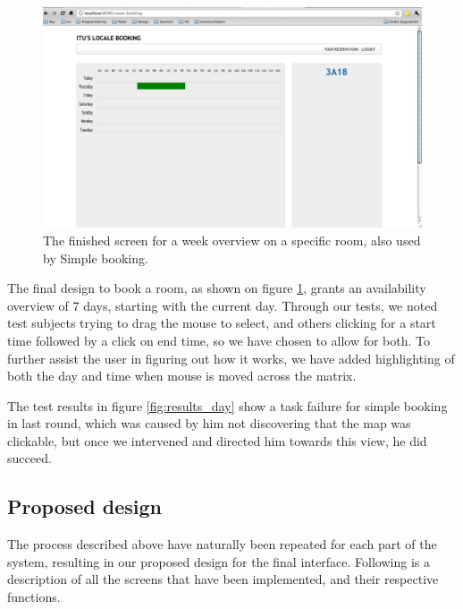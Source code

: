 \pagebreak
\begin{figure}[htb]
\begin{center}
\leavevmode
\includegraphics[width=1\textwidth]{images/weekFinal}
\end{center}
\caption{The finished screen for a week overview on a specific room, also used by Simple booking.}
\label{fig:week_final}
\end{figure}

The final design to book a room, as shown on figure \ref{fig:week_final}, grants an availability overview of 7 days, starting with the current day. Through our tests, we noted test subjects trying to drag the mouse to select, and others clicking for a start time followed by a click on end time, so we have chosen to allow for both.
To further assist the user in figuring out how it works, we have added highlighting of both the day and time when mouse is moved across the matrix.

The test results in figure \ref{fig:results_day} show a task failure for simple booking in last round, which was caused by him not discovering that the map was clickable, but once we intervened and directed him towards this view, he did succeed.


\subsection{Proposed design}
\label{sec:proposed_design_dtd}
The process described above have naturally been repeated for each part of the system, resulting in our proposed design for the final interface.
Following is a description of all the screens that have been implemented, and their respective functions.

\pagebreak
